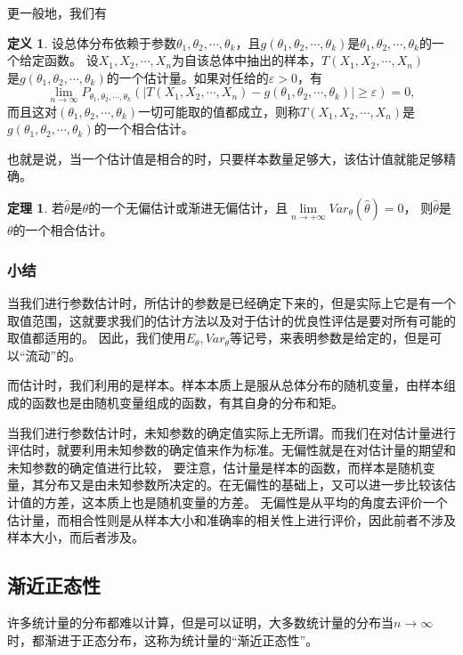 \documentclass[a4paper,11pt]{article}%
\theoremstyle{remark}
\theoremstyle{remark}
\theoremstyle{definition}
\newtheorem{theorem}{定理}[section]
\theoremstyle{definition}
\newtheorem*{definition}{定义}
\theoremstyle{plain}
\newcommand*{\abs}[1]{\lvert #1 \rvert}
\begin{document}
更一般地，我们有
\begin{definition}
    设总体分布依赖于参数$\theta_1,\theta_2,\cdots,\theta_k$，且$g(\theta_1,\theta_2,\cdots,\theta_k)$是$\theta_1,\theta_2,\cdots,\theta_k$的一个给定函数。
    设$X_1,X_2,\cdots,X_n$为自该总体中抽出的样本，$T(X_1,X_2,\cdots,X_n)$\\是$g(\theta_1,\theta_2,\cdots,\theta_k)$的一个估计量。如果对任给的$\varepsilon>0$，有
    \[\lim_{n\rightarrow\infty}P_{\theta_1,\theta_2,\cdots,\theta_k}(\abs{T(X_1,X_2,\cdots,X_n)-g(\theta_1,\theta_2,\cdots,\theta_k)}\geq\varepsilon)=0,\]
    而且这对$(\theta_1,\theta_2,\cdots,\theta_k)$一切可能取的值都成立，则称$T(X_1,X_2,\cdots,X_n)$是\\$g(\theta_1,\theta_2,\cdots,\theta_k)$的一个相合估计。
\end{definition}
也就是说，当一个估计值是相合的时，只要样本数量足够大，该估计值就能足够精确。
\begin{theorem}
    若$\hat{\theta}$是$\theta$的一个无偏估计或渐进无偏估计，且$\lim\limits_{n\rightarrow+\infty}Var_{\theta}(\hat{\theta})=0$，
    则$\hat{\theta}$是$\theta$的一个相合估计。
\end{theorem}
\subsubsection{小结}
当我们进行参数估计时，所估计的参数是已经确定下来的，但是实际上它是有一个取值范围，这就要求我们的估计方法以及对于估计的优良性评估是要对所有可能的取值都适用的。
因此，我们使用$E_{\theta},Var_{\theta}$等记号，来表明参数是给定的，但是可以“流动”的。

而估计时，我们利用的是样本。样本本质上是服从总体分布的随机变量，由样本组成的函数也是由随机变量组成的函数，有其自身的分布和矩。

当我们进行参数估计时，未知参数的确定值实际上无所谓。而我们在对估计量进行评估时，就要利用未知参数的确定值来作为标准。无偏性就是在对估计量的期望和未知参数的确定值进行比较，
要注意，估计量是样本的函数，而样本是随机变量，其分布又是由未知参数所决定的。在无偏性的基础上，又可以进一步比较该估计值的方差，这本质上也是随机变量的方差。
无偏性是从平均的角度去评价一个估计量，而相合性则是从样本大小和准确率的相关性上进行评价，因此前者不涉及样本大小，而后者涉及。
\subsection{渐近正态性}
许多统计量的分布都难以计算，但是可以证明，大多数统计量的分布当$n\rightarrow\infty$时，都渐进于正态分布，这称为统计量的“渐近正态性”。
\end{document}
